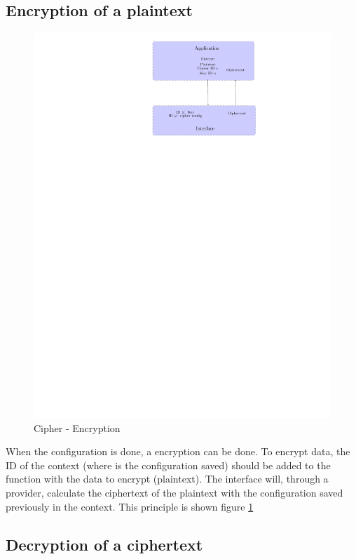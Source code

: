 \subsection*{Encryption of a plaintext}
\begin{figure}[!ht]
\centering
\includegraphics[trim=16cm 20cm 9.5cm 0cm]{figures/cipher_encrypt.pdf}
\caption{Cipher - Encryption\newline}
\label{fig:gci_cipher_encrypt}
\end{figure}
When the configuration is done, a encryption can be done.
To encrypt data, the ID of the context (where is the configuration saved)
should be added to the function with the data to encrypt (plaintext).
The interface will, through a provider, calculate the ciphertext of the
plaintext with the configuration saved previously in the context.
This principle is shown figure \ref{fig:gci_cipher_encrypt}


\subsection*{Decryption of a ciphertext}

